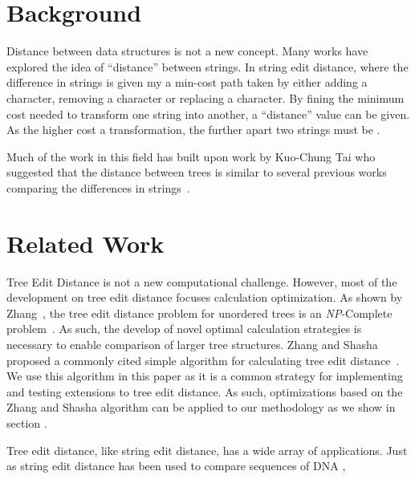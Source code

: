 \section{Background}

Distance between data structures is not a new concept. Many works have explored the idea of ``distance'' between strings. In string edit distance, where the difference in strings is given my a min-cost path taken by either adding a character, removing a character or replacing a character. By fining the minimum cost needed to transform one string into another, a ``distance'' value can be given. As the higher cost a transformation, the further apart two strings must be .

Much of the work in this field has built upon work by Kuo-Chung Tai who suggested that the distance between trees is similar to several previous works comparing the differences in strings~\cite{tai_tree--tree_nodate}.

\section{Related Work}

Tree Edit Distance is not a new computational challenge. However, most of the development on tree edit distance focuses calculation optimization. As shown by Zhang~\etal, the tree edit distance problem for unordered trees is an \textit{NP}-Complete problem~\cite{zhang_editing_1992}. As such, the develop of novel optimal calculation strategies is necessary to enable comparison of larger tree structures. Zhang and Shasha proposed a commonly cited simple algorithm for calculating tree edit distance~\cite{zhang_simple_1989}. We use this algorithm in this paper as it is a common strategy for implementing and testing extensions to tree edit distance. As such, optimizations based on the Zhang and Shasha algorithm can be applied to our methodology as we show in section .

Tree edit distance, like string edit distance, has a wide array of applications. Just as string edit distance has been used to compare sequences of DNA ,
